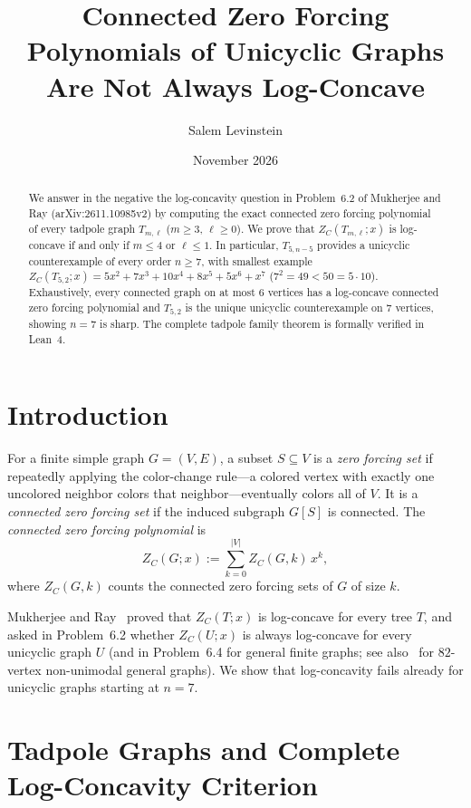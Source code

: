\documentclass[11pt]{article}
\title{Connected Zero Forcing Polynomials of Unicyclic Graphs Are Not Always Log-Concave}
\author{Salem Levinstein}
\date{November 2026}
\begin{document}
\maketitle

\begin{abstract}
We answer in the negative the log-concavity question in Problem~6.2 of
Mukherjee and Ray (arXiv:2611.10985v2) by computing the exact connected
zero forcing polynomial of every tadpole graph $T_{m,\ell}$ ($m \ge 3$,
$\ell \ge 0$). We prove that $Z_C(T_{m,\ell}; x)$ is log-concave if and only if
$m \le 4$ or $\ell \le 1$. In particular, $T_{5, n-5}$ provides a unicyclic
counterexample of every order $n \ge 7$, with smallest example
$Z_C(T_{5,2}; x) = 5x^2 + 7x^3 + 10x^4 + 8x^5 + 5x^6 + x^7$
($7^2 = 49 < 50 = 5 \cdot 10$). Exhaustively, every connected graph on at most
$6$ vertices has a log-concave connected zero forcing polynomial and $T_{5,2}$
is the unique unicyclic counterexample on $7$ vertices, showing $n = 7$ is sharp.
The complete tadpole family theorem is formally verified in Lean~4.
\end{abstract}

\section{Introduction}

For a finite simple graph $G = (V, E)$, a subset $S \subseteq V$ is a
\emph{zero forcing set} if repeatedly applying the color-change rule---a colored
vertex with exactly one uncolored neighbor colors that neighbor---eventually
colors all of $V$. It is a \emph{connected zero forcing set} if the induced
subgraph $G[S]$ is connected. The \emph{connected zero forcing polynomial} is
\[
Z_C(G; x) := \sum_{k=0}^{|V|} Z_C(G, k)\, x^k,
\]
where $Z_C(G, k)$ counts the connected zero forcing sets of $G$ of size $k$.

Mukherjee and Ray~\cite{MR2026} proved that $Z_C(T; x)$ is log-concave for every
tree $T$, and asked in Problem~6.2 whether $Z_C(U; x)$ is always log-concave for
every unicyclic graph $U$ (and in Problem~6.4 for general finite graphs; see
also~\cite{NB2026} for $82$-vertex non-unimodal general graphs). We show that
log-concavity fails already for unicyclic graphs starting at $n = 7$.

\section{Tadpole Graphs and Complete Log-Concavity Criterion}
\end{document}
